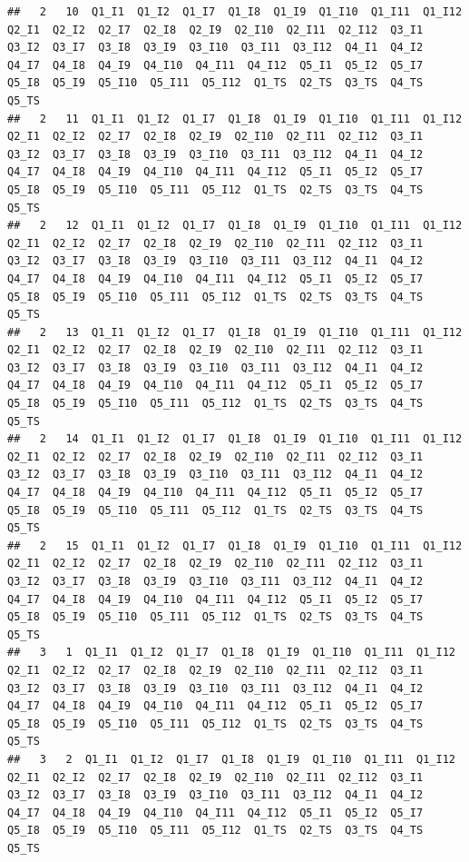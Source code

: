 \documentclass[
]{book}
\begin{document}
\begin{verbatim}
##   2   10  Q1_I1  Q1_I2  Q1_I7  Q1_I8  Q1_I9  Q1_I10  Q1_I11  Q1_I12  Q2_I1  Q2_I2  Q2_I7  Q2_I8  Q2_I9  Q2_I10  Q2_I11  Q2_I12  Q3_I1  Q3_I2  Q3_I7  Q3_I8  Q3_I9  Q3_I10  Q3_I11  Q3_I12  Q4_I1  Q4_I2  Q4_I7  Q4_I8  Q4_I9  Q4_I10  Q4_I11  Q4_I12  Q5_I1  Q5_I2  Q5_I7  Q5_I8  Q5_I9  Q5_I10  Q5_I11  Q5_I12  Q1_TS  Q2_TS  Q3_TS  Q4_TS  Q5_TS
##   2   11  Q1_I1  Q1_I2  Q1_I7  Q1_I8  Q1_I9  Q1_I10  Q1_I11  Q1_I12  Q2_I1  Q2_I2  Q2_I7  Q2_I8  Q2_I9  Q2_I10  Q2_I11  Q2_I12  Q3_I1  Q3_I2  Q3_I7  Q3_I8  Q3_I9  Q3_I10  Q3_I11  Q3_I12  Q4_I1  Q4_I2  Q4_I7  Q4_I8  Q4_I9  Q4_I10  Q4_I11  Q4_I12  Q5_I1  Q5_I2  Q5_I7  Q5_I8  Q5_I9  Q5_I10  Q5_I11  Q5_I12  Q1_TS  Q2_TS  Q3_TS  Q4_TS  Q5_TS
##   2   12  Q1_I1  Q1_I2  Q1_I7  Q1_I8  Q1_I9  Q1_I10  Q1_I11  Q1_I12  Q2_I1  Q2_I2  Q2_I7  Q2_I8  Q2_I9  Q2_I10  Q2_I11  Q2_I12  Q3_I1  Q3_I2  Q3_I7  Q3_I8  Q3_I9  Q3_I10  Q3_I11  Q3_I12  Q4_I1  Q4_I2  Q4_I7  Q4_I8  Q4_I9  Q4_I10  Q4_I11  Q4_I12  Q5_I1  Q5_I2  Q5_I7  Q5_I8  Q5_I9  Q5_I10  Q5_I11  Q5_I12  Q1_TS  Q2_TS  Q3_TS  Q4_TS  Q5_TS
##   2   13  Q1_I1  Q1_I2  Q1_I7  Q1_I8  Q1_I9  Q1_I10  Q1_I11  Q1_I12  Q2_I1  Q2_I2  Q2_I7  Q2_I8  Q2_I9  Q2_I10  Q2_I11  Q2_I12  Q3_I1  Q3_I2  Q3_I7  Q3_I8  Q3_I9  Q3_I10  Q3_I11  Q3_I12  Q4_I1  Q4_I2  Q4_I7  Q4_I8  Q4_I9  Q4_I10  Q4_I11  Q4_I12  Q5_I1  Q5_I2  Q5_I7  Q5_I8  Q5_I9  Q5_I10  Q5_I11  Q5_I12  Q1_TS  Q2_TS  Q3_TS  Q4_TS  Q5_TS
##   2   14  Q1_I1  Q1_I2  Q1_I7  Q1_I8  Q1_I9  Q1_I10  Q1_I11  Q1_I12  Q2_I1  Q2_I2  Q2_I7  Q2_I8  Q2_I9  Q2_I10  Q2_I11  Q2_I12  Q3_I1  Q3_I2  Q3_I7  Q3_I8  Q3_I9  Q3_I10  Q3_I11  Q3_I12  Q4_I1  Q4_I2  Q4_I7  Q4_I8  Q4_I9  Q4_I10  Q4_I11  Q4_I12  Q5_I1  Q5_I2  Q5_I7  Q5_I8  Q5_I9  Q5_I10  Q5_I11  Q5_I12  Q1_TS  Q2_TS  Q3_TS  Q4_TS  Q5_TS
##   2   15  Q1_I1  Q1_I2  Q1_I7  Q1_I8  Q1_I9  Q1_I10  Q1_I11  Q1_I12  Q2_I1  Q2_I2  Q2_I7  Q2_I8  Q2_I9  Q2_I10  Q2_I11  Q2_I12  Q3_I1  Q3_I2  Q3_I7  Q3_I8  Q3_I9  Q3_I10  Q3_I11  Q3_I12  Q4_I1  Q4_I2  Q4_I7  Q4_I8  Q4_I9  Q4_I10  Q4_I11  Q4_I12  Q5_I1  Q5_I2  Q5_I7  Q5_I8  Q5_I9  Q5_I10  Q5_I11  Q5_I12  Q1_TS  Q2_TS  Q3_TS  Q4_TS  Q5_TS
##   3   1  Q1_I1  Q1_I2  Q1_I7  Q1_I8  Q1_I9  Q1_I10  Q1_I11  Q1_I12  Q2_I1  Q2_I2  Q2_I7  Q2_I8  Q2_I9  Q2_I10  Q2_I11  Q2_I12  Q3_I1  Q3_I2  Q3_I7  Q3_I8  Q3_I9  Q3_I10  Q3_I11  Q3_I12  Q4_I1  Q4_I2  Q4_I7  Q4_I8  Q4_I9  Q4_I10  Q4_I11  Q4_I12  Q5_I1  Q5_I2  Q5_I7  Q5_I8  Q5_I9  Q5_I10  Q5_I11  Q5_I12  Q1_TS  Q2_TS  Q3_TS  Q4_TS  Q5_TS
##   3   2  Q1_I1  Q1_I2  Q1_I7  Q1_I8  Q1_I9  Q1_I10  Q1_I11  Q1_I12  Q2_I1  Q2_I2  Q2_I7  Q2_I8  Q2_I9  Q2_I10  Q2_I11  Q2_I12  Q3_I1  Q3_I2  Q3_I7  Q3_I8  Q3_I9  Q3_I10  Q3_I11  Q3_I12  Q4_I1  Q4_I2  Q4_I7  Q4_I8  Q4_I9  Q4_I10  Q4_I11  Q4_I12  Q5_I1  Q5_I2  Q5_I7  Q5_I8  Q5_I9  Q5_I10  Q5_I11  Q5_I12  Q1_TS  Q2_TS  Q3_TS  Q4_TS  Q5_TS

\end{verbatim}
\end{document}
